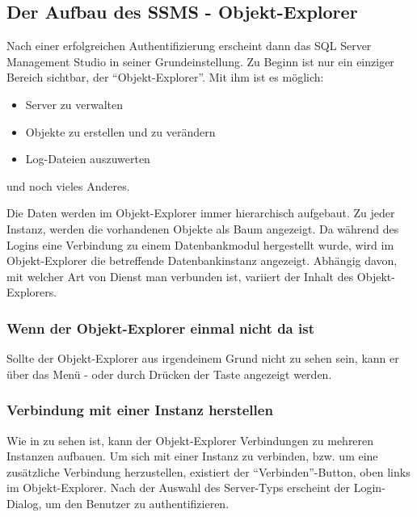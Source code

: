       \subsection{Der Aufbau des SSMS - Objekt-Explorer}
        Nach einer erfolgreichen Authentifizierung erscheint dann das SQL Server
        Management Studio in seiner Grundeinstellung.
        Zu Beginn ist nur ein einziger Bereich sichtbar, der
        \enquote{Objekt-Explorer}. Mit ihm ist es möglich:
        \begin{itemize}
            \item Server zu verwalten
            \item Objekte zu erstellen und zu verändern
            \item Log-Dateien auszuwerten
        \end{itemize}
        und noch vieles Anderes. 
        
        Die Daten werden im Objekt-Explorer immer hierarchisch aufgebaut. Zu
        jeder Instanz, werden die vorhandenen Objekte als Baum angezeigt. Da
        während des Logins eine Verbindung zu einem Datenbankmodul hergestellt
        wurde, wird im Objekt-Explorer die betreffende Datenbankinstanz
        angezeigt.
        Abhängig davon, mit welcher Art von Dienst man verbunden ist,
        variiert der Inhalt des Objekt-Explorers.
        \subsubsection{Wenn der Objekt-Explorer einmal nicht da ist}
          Sollte der Objekt-Explorer aus irgendeinem Grund nicht zu sehen sein,
          kann er über das Menü  -
           oder durch Drücken der Taste
           angezeigt werden.
        \subsubsection{Verbindung mit einer Instanz herstellen}
          Wie in  zu sehen ist, kann
          der Objekt-Explorer Verbindungen zu mehreren Instanzen aufbauen. Um
          sich mit einer Instanz zu verbinden, bzw. um eine zusätzliche
          Verbindung herzustellen, existiert der \enquote{Verbinden}-Button,
          oben links im Objekt-Explorer.
           Nach der
          Auswahl des Server-Typs erscheint der Login-Dialog, um den Benutzer zu authentifizieren.
